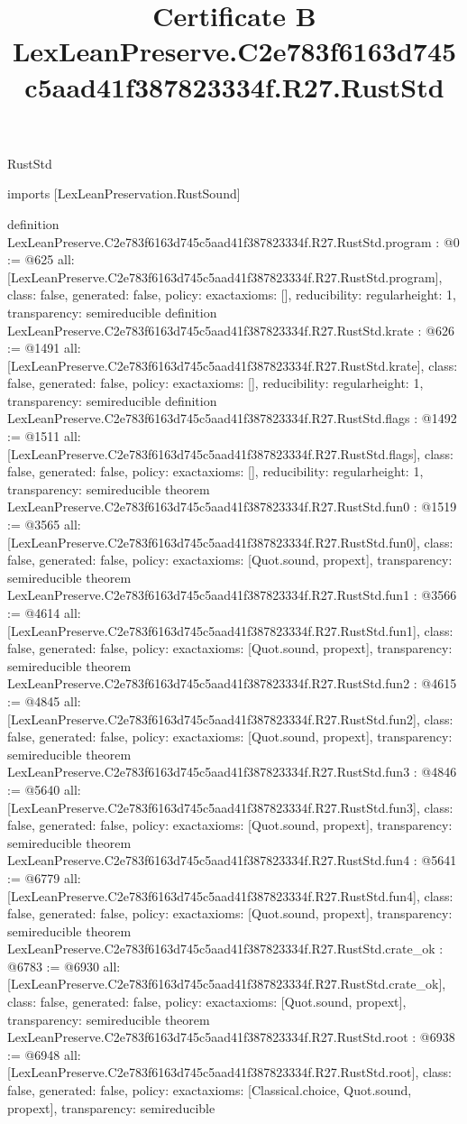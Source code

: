 \begin{lexlean}{RustStd}
\title{Certificate B LexLeanPreserve.C2e783f6163d745c5aad41f387823334f.R27.RustStd}
\begin{coremodule}
imports [LexLeanPreservation.RustSound]

definition LexLeanPreserve.C2e783f6163d745c5aad41f387823334f.R27.RustStd.program : @0 := @625 {
  all: [LexLeanPreserve.C2e783f6163d745c5aad41f387823334f.R27.RustStd.program],
  class: false,
  generated: false,
  policy: exact{axioms: []},
  reducibility: regular{height: 1},
  transparency: semireducible
}
definition LexLeanPreserve.C2e783f6163d745c5aad41f387823334f.R27.RustStd.krate : @626 := @1491 {
  all: [LexLeanPreserve.C2e783f6163d745c5aad41f387823334f.R27.RustStd.krate],
  class: false,
  generated: false,
  policy: exact{axioms: []},
  reducibility: regular{height: 1},
  transparency: semireducible
}
definition LexLeanPreserve.C2e783f6163d745c5aad41f387823334f.R27.RustStd.flags : @1492 := @1511 {
  all: [LexLeanPreserve.C2e783f6163d745c5aad41f387823334f.R27.RustStd.flags],
  class: false,
  generated: false,
  policy: exact{axioms: []},
  reducibility: regular{height: 1},
  transparency: semireducible
}
theorem LexLeanPreserve.C2e783f6163d745c5aad41f387823334f.R27.RustStd.fun0 : @1519 := @3565 {
  all: [LexLeanPreserve.C2e783f6163d745c5aad41f387823334f.R27.RustStd.fun0],
  class: false,
  generated: false,
  policy: exact{axioms: [Quot.sound, propext]},
  transparency: semireducible
}
theorem LexLeanPreserve.C2e783f6163d745c5aad41f387823334f.R27.RustStd.fun1 : @3566 := @4614 {
  all: [LexLeanPreserve.C2e783f6163d745c5aad41f387823334f.R27.RustStd.fun1],
  class: false,
  generated: false,
  policy: exact{axioms: [Quot.sound, propext]},
  transparency: semireducible
}
theorem LexLeanPreserve.C2e783f6163d745c5aad41f387823334f.R27.RustStd.fun2 : @4615 := @4845 {
  all: [LexLeanPreserve.C2e783f6163d745c5aad41f387823334f.R27.RustStd.fun2],
  class: false,
  generated: false,
  policy: exact{axioms: [Quot.sound, propext]},
  transparency: semireducible
}
theorem LexLeanPreserve.C2e783f6163d745c5aad41f387823334f.R27.RustStd.fun3 : @4846 := @5640 {
  all: [LexLeanPreserve.C2e783f6163d745c5aad41f387823334f.R27.RustStd.fun3],
  class: false,
  generated: false,
  policy: exact{axioms: [Quot.sound, propext]},
  transparency: semireducible
}
theorem LexLeanPreserve.C2e783f6163d745c5aad41f387823334f.R27.RustStd.fun4 : @5641 := @6779 {
  all: [LexLeanPreserve.C2e783f6163d745c5aad41f387823334f.R27.RustStd.fun4],
  class: false,
  generated: false,
  policy: exact{axioms: [Quot.sound, propext]},
  transparency: semireducible
}
theorem LexLeanPreserve.C2e783f6163d745c5aad41f387823334f.R27.RustStd.crate_ok : @6783 := @6930 {
  all: [LexLeanPreserve.C2e783f6163d745c5aad41f387823334f.R27.RustStd.crate_ok],
  class: false,
  generated: false,
  policy: exact{axioms: [Quot.sound, propext]},
  transparency: semireducible
}
theorem LexLeanPreserve.C2e783f6163d745c5aad41f387823334f.R27.RustStd.root : @6938 := @6948 {
  all: [LexLeanPreserve.C2e783f6163d745c5aad41f387823334f.R27.RustStd.root],
  class: false,
  generated: false,
  policy: exact{axioms: [Classical.choice, Quot.sound, propext]},
  transparency: semireducible
}


\end{coremodule}
\end{lexlean}
